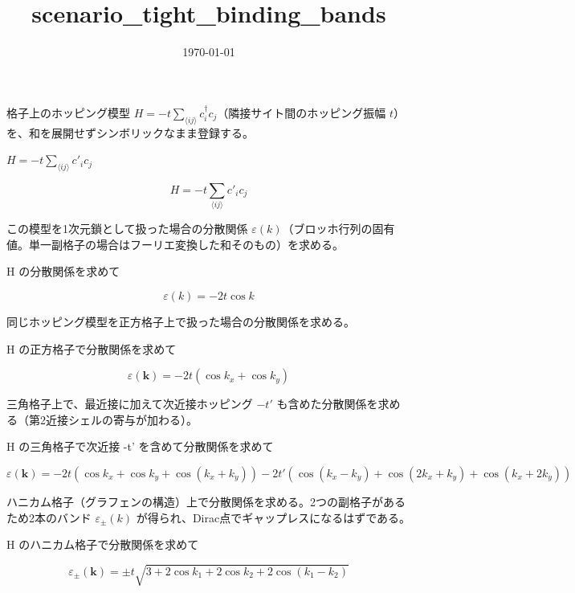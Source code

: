 \documentclass[dvipdfmx,a4paper,11pt]{jsarticle}
\title{scenario\_tight\_binding\_bands}
\date{\today}
\begin{document}
\maketitle

格子上のホッピング模型 $H=-t\sum_{\langle ij\rangle}c^\dagger_ic_j$（隣接サイト間のホッピング振幅 $t$）を、和を展開せずシンボリックなまま登録する。

$H = -t \sum_{\langle i j \rangle} c'_i c_j$

\begin{equation}
  H = -t \sum_{\langle ij \rangle} c'_i c_j
  \label{eq:E1}
\end{equation}

この模型を1次元鎖として扱った場合の分散関係 $\varepsilon(k)$（ブロッホ行列の固有値。単一副格子の場合はフーリエ変換した和そのもの）を求める。

H の分散関係を求めて

\begin{equation}
  \varepsilon(k) = -2t \cos k
  \label{eq:E2}
\end{equation}

同じホッピング模型を正方格子上で扱った場合の分散関係を求める。

H の正方格子で分散関係を求めて

\begin{equation}
  \varepsilon(\mathbf{k}) = -2t \left( \cos k_x + \cos k_y \right)
  \label{eq:E3}
\end{equation}

三角格子上で、最近接に加えて次近接ホッピング $-t'$ も含めた分散関係を求める（第2近接シェルの寄与が加わる）。

H の三角格子で次近接 -t' を含めて分散関係を求めて

\begin{equation}
  \varepsilon(\mathbf{k}) = -2t \left( \cos k_x + \cos k_y + \cos(k_x + k_y) \right) -2t' \left( \cos(k_x - k_y) + \cos(2 k_x + k_y) + \cos(k_x + 2 k_y) \right)
  \label{eq:E4}
\end{equation}

ハニカム格子（グラフェンの構造）上で分散関係を求める。2つの副格子があるため2本のバンド $\varepsilon_\pm(k)$ が得られ、Dirac点でギャップレスになるはずである。

H のハニカム格子で分散関係を求めて

\begin{equation}
  \varepsilon_\pm(\mathbf{k}) = \pm t \sqrt{ 3 + 2\cos k_1 + 2\cos k_2 + 2\cos(k_1 - k_2) }
  \label{eq:E5}
\end{equation}
\end{document}
